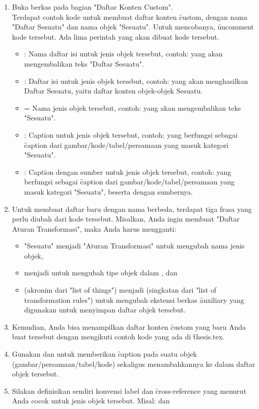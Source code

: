 \begin{enumerate}
	\item Buka berkas  pada bagian "Daftar Konten Custom". \\
	Terdapat contoh kode untuk membuat daftar konten \f{custom}, dengan nama "Daftar Sesuatu" dan nama objek "Sesuatu". Untuk mencobanya, \f{uncomment} kode tersebut. Ada lima perintah yang akan dibuat kode tersebut.
	\begin{itemize}
		\item {}: Nama daftar isi untuk jenis objek tersebut, contoh:  yang akan mengembalikan teks "Daftar Sesuatu".
		\item {}: Daftar isi untuk jenis objek tersebut, contoh:  yang akan menghasilkan Daftar Sesuatu, yaitu daftar konten objek-objek Sesuatu.
		\item {} = Nama jenis objek tersebut, contoh:  yang akan mengembalikan teks "Sesuatu".
		\item {}: Caption untuk jenis objek tersebut, contoh:  yang berfungsi sebagai \f{caption} dari gambar/kode/tabel/persamaan yang masuk kategori "Sesuatu".
		\item {}: Caption dengan sumber untuk jenis objek tersebut, contoh:  yang berfungsi sebagai \f{caption} dari gambar/kode/tabel/persamaan yang masuk kategori "Sesuatu", beserta dengan sumbernya.
	\end{itemize}
	\item Untuk membuat daftar baru dengan nama berbeda, terdapat tiga frasa yang perlu diubah dari kode tersebut. Misalkan, Anda ingin membuat "Daftar Aturan Transformasi", maka Anda harus mengganti:
	\begin{itemize}
		\item "Sesuatu" menjadi "Aturan Transformasi" untuk mengubah nama jenis objek,
		\item {} menjadi  untuk mengubah tipe objek dalam \latex, dan
		\item {} (akronim dari "list of things") menjadi  (singkatan dari "list of transformation rules") untuk mengubah ekstensi berkas \f{auxiliary} yang digunakan untuk menyimpan daftar objek tersebut.
	\end{itemize}
	\item Kemudian, Anda bisa menampilkan daftar konten \f{custom} yang baru Anda buat tersebut dengan mengikuti contoh kode yang ada di \f{thesis.tex}.
	\item Gunakan  dan  untuk memberikan \f{caption} pada suatu objek (gambar/persamaan/tabel/kode) sekaligus menambahkannya ke dalam daftar objek tersebut.
	\item Silakan definisikan sendiri konvensi label dan \f{cross-reference} yang menurut Anda cocok untuk jenis objek tersebut. Misal:  dan 
\end{enumerate}


